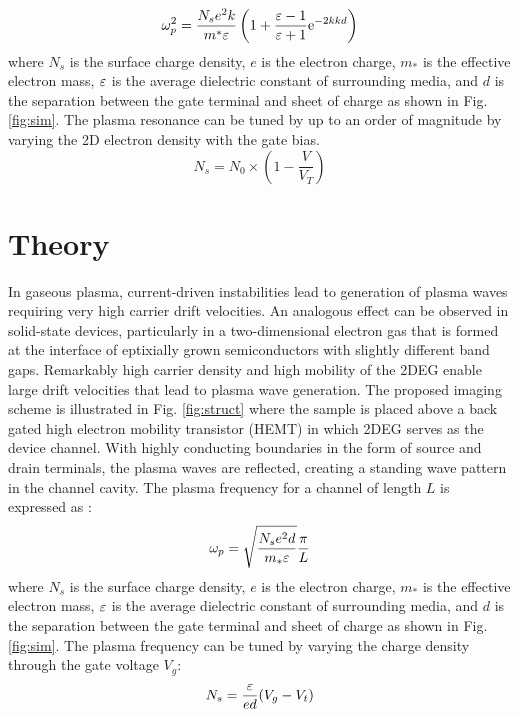 \documentclass[11pt]{article}
\begin{document}
%
\begin{equation}
  \omega_p^2 = \frac{N_s e^2 k}{m^{\ast}\varepsilon}\left(1 + \frac{\varepsilon - 1}{\varepsilon + 1}\mathrm{e}^{-2k  k d}\right)
  \label{eq:plasma_f_HEMT}
\end{equation}
%
where $N_s$ is the surface charge density, $e$ is the electron charge, $m_{\ast}$ is the effective electron mass, $\varepsilon$ is the average dielectric constant of surrounding media, and $d$ is the separation between the gate terminal and sheet of charge as shown in Fig. \ref{fig:sim}.
The plasma resonance can be tuned by up to an order of magnitude by varying the 2D electron density with the gate bias.
%
\begin{equation}
  N_s = N_0 \times(1 - \frac{V}{V_T})
  \label{eq:tunability}
\end{equation}
%
\section{Theory}
%
In gaseous plasma, current-driven instabilities lead to generation of plasma waves requiring very high carrier drift velocities. An analogous effect can be observed in solid-state devices, particularly in a two-dimensional electron gas that is formed at the interface of eptixially grown semiconductors with slightly different band gaps. Remarkably high carrier density and high mobility of the 2DEG enable large drift velocities that lead to plasma wave generation.
The proposed imaging scheme is illustrated in Fig. \ref{fig:struct} where the sample is placed above a back gated high electron mobility transistor (HEMT) in which 2DEG serves as the device channel. With highly conducting boundaries in the form of source and drain terminals, the plasma waves are reflected, creating a standing wave pattern in the channel cavity. The plasma frequency for a channel of length $L$ is expressed as \cite{Popov2008}:
%
\begin{equation}
  \omega_p = \sqrt{\frac{N_s e^2 d}{m_{\ast} \varepsilon}} \frac{\pi}{L}
\end{equation}
%
where $N_s$ is the surface charge density, $e$ is the electron charge, $m_{\ast}$ is the effective electron mass, $\varepsilon$ is the average dielectric constant of surrounding media, and $d$ is the separation between the gate terminal and sheet of charge as shown in Fig. \ref{fig:sim}. The plasma frequency can be tuned by varying the charge density through the gate voltage $V_g$:
%
\begin{equation}
  N_s = \frac{\varepsilon}{e d}(V_g - V_t)
  \label{eq:tunability}
\end{equation}
\end{document}

